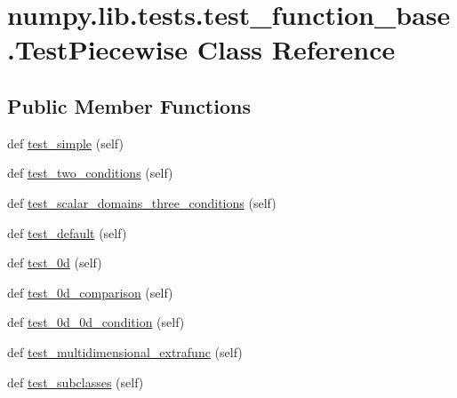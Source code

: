 \hypertarget{classnumpy_1_1lib_1_1tests_1_1test__function__base_1_1TestPiecewise}{}\section{numpy.\+lib.\+tests.\+test\+\_\+function\+\_\+base.\+Test\+Piecewise Class Reference}
\label{classnumpy_1_1lib_1_1tests_1_1test__function__base_1_1TestPiecewise}
\subsection*{Public Member Functions}
\begin{DoxyCompactItemize}
\item 
def \hyperlink{classnumpy_1_1lib_1_1tests_1_1test__function__base_1_1TestPiecewise_aae6850b18ef8407c3f4e3a9851651699}{test\+\_\+simple} (self)
\item 
def \hyperlink{classnumpy_1_1lib_1_1tests_1_1test__function__base_1_1TestPiecewise_ae687f6d95ed4dc3a2fb1dc20095a5bb4}{test\+\_\+two\+\_\+conditions} (self)
\item 
def \hyperlink{classnumpy_1_1lib_1_1tests_1_1test__function__base_1_1TestPiecewise_a0a3a74dc474992d956c208c8ae395833}{test\+\_\+scalar\+\_\+domains\+\_\+three\+\_\+conditions} (self)
\item 
def \hyperlink{classnumpy_1_1lib_1_1tests_1_1test__function__base_1_1TestPiecewise_a99421c5d14a7188df3c75cd1368a7fc8}{test\+\_\+default} (self)
\item 
def \hyperlink{classnumpy_1_1lib_1_1tests_1_1test__function__base_1_1TestPiecewise_ad3d8138cfa31c289eab518ba059f4e0d}{test\+\_\+0d} (self)
\item 
def \hyperlink{classnumpy_1_1lib_1_1tests_1_1test__function__base_1_1TestPiecewise_a178f3bf16517e753bea3b1307c908801}{test\+\_\+0d\+\_\+comparison} (self)
\item 
def \hyperlink{classnumpy_1_1lib_1_1tests_1_1test__function__base_1_1TestPiecewise_a746e0f387b19898ba855acdfe346ded5}{test\+\_\+0d\+\_\+0d\+\_\+condition} (self)
\item 
def \hyperlink{classnumpy_1_1lib_1_1tests_1_1test__function__base_1_1TestPiecewise_a54a40c12fafb8069b167170d5996bfd3}{test\+\_\+multidimensional\+\_\+extrafunc} (self)
\item 
def \hyperlink{classnumpy_1_1lib_1_1tests_1_1test__function__base_1_1TestPiecewise_a799766124f028d4fd0018cb496831595}{test\+\_\+subclasses} (self)
\end{DoxyCompactItemize}


